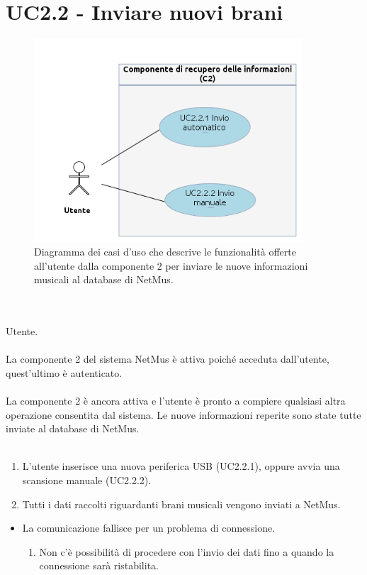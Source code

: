 \section{UC2.2 - Inviare nuovi brani}
\begin{figure}[h]
  \centering
  \includegraphics[width=10cm]{img/AR/UC2_2.png}
\caption{Diagramma dei casi d'uso che descrive le funzionalit\`a offerte
all'utente dalla componente 2 per inviare le nuove informazioni musicali al
database di NetMus.}
\end{figure}

\vspace*{0.5cm}
\\\\
 Utente. \\\\ 
 La componente 2 del sistema NetMus \`e attiva poich\'e acceduta
dall'utente, quest'ultimo \`e autenticato. \\\\
 La componente 2 \`e ancora attiva e l'utente \`e pronto a
compiere qualsiasi altra operazione consentita dal sistema. Le nuove
informazioni reperite sono state tutte inviate al database di NetMus.\\\\
\begin{enumerate}
  \item L'utente inserisce una nuova periferica USB (UC2.2.1), oppure avvia una
  scansione manuale (UC2.2.2).
  \item Tutti i dati raccolti riguardanti brani musicali vengono inviati a
  NetMus.
\end{enumerate}
\begin{itemize}
  \item La comunicazione fallisce per un problema di connessione.
  \begin {enumerate}
    \item Non c'\`e possibilit\`a di procedere con l'invio dei dati fino a
    quando la connessione sar\`a ristabilita.
  \end{enumerate}
\end{itemize}
\newpage


